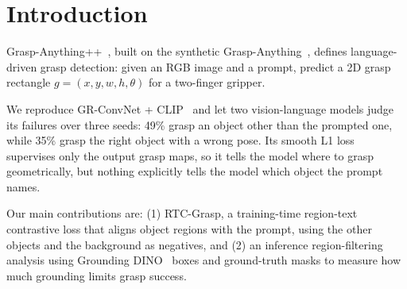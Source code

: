 \section{Introduction}
\label{sec:intro}

Grasp-Anything++~\cite{vuong2024language}, built on the synthetic Grasp-Anything~\cite{vuong2023grasp}, defines language-driven grasp detection: given an RGB image and a prompt, predict a 2D grasp rectangle $g = (x, y, w, h, \theta)$ for a two-finger gripper.

We reproduce GR-ConvNet + CLIP~\cite{kumra2020antipodal,vuong2024language} and let two vision-language models judge its failures over three seeds: 49\% grasp an object other than the prompted one, while 35\% grasp the right object with a wrong pose.
Its smooth L1 loss supervises only the output grasp maps, so it tells the model where to grasp geometrically, but nothing explicitly tells the model which object the prompt names.

Our main contributions are: (1) RTC-Grasp, a training-time region-text contrastive loss that aligns object regions with the prompt, using the other objects and the background as negatives, and (2) an inference region-filtering analysis using Grounding DINO~\cite{liu2024grounding} boxes and ground-truth masks to measure how much grounding limits grasp success.
